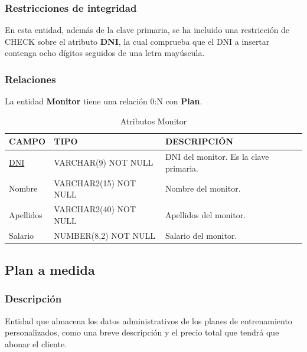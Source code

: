 \documentclass[12pt, a4paper]{article}
\begin{document}
	\subsubsection*{Restricciones de integridad}
	En esta entidad, además de la clave primaria, se ha incluido una restricción de CHECK sobre el atributo \textbf{DNI}, la cual comprueba que el DNI a insertar contenga ocho dígitos seguidos de una letra mayúscula.
	\subsubsection*{Relaciones}
	La entidad \textbf{Monitor} tiene una relación 0:N con \textbf{Plan}.
	\begin{table}[H]
		\centering
		\caption{Atributos Monitor}
		\begin{tabular}{@{} m{2.5cm} m{5.5cm} m{7cm} @{}}
			\toprule
			\textbf{CAMPO} & \textbf{TIPO} & \textbf{DESCRIPCIÓN} \\ \midrule
			\underline{DNI} & VARCHAR(9) NOT NULL & DNI del monitor. Es la clave primaria. \\
			Nombre & VARCHAR2(15) NOT NULL & Nombre del monitor. \\
			Apellidos & VARCHAR2(40) NOT NULL & Apellidos del monitor. \\
			Salario & NUMBER(8,2) NOT NULL & Salario del monitor. \\ \bottomrule
		\end{tabular}
	\end{table}
	
	\subsection{Plan a medida}
	\subsubsection*{Descripción}
	Entidad que almacena los datos administrativos de los planes de entrenamiento personalizados, como una breve descripción y el precio total que tendrá que abonar el cliente.
\end{document}
